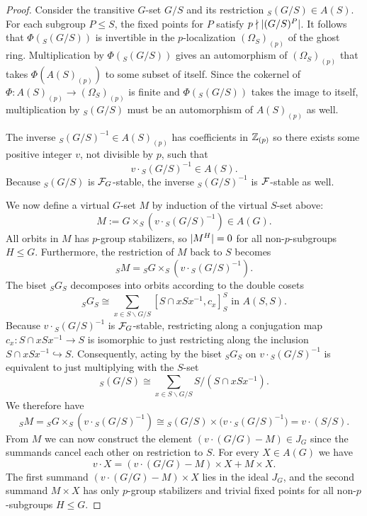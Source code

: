 \documentclass[10pt]{amsart}
\theoremstyle{definition}
\DeclarePairedDelimiter{\abs}{\lvert}{\rvert}
\begin{document}
\begin{proof}
Consider the transitive $G$-set $G/S$ and its restriction ${}_S(G/S)\in A(S)$. For each subgroup $P\leq S$, the fixed points for $P$ satisfy $p\nmid \abs{(G/S)^P}$. It follows that $\Phi({}_S(G/S))$ is invertible in the $p$-localization $(\Omega_S)_{(p)}$ of the ghost ring.
Multiplication by $\Phi({}_S (G/S))$ gives an automorphism of $(\Omega_S)_{(p)}$ that takes $\Phi(A(S)_{(p)})$ to some subset of itself. Since the cokernel of $\Phi\colon A(S)_{(p)}\to (\Omega_S)_{(p)}$ is finite and $\Phi({}_S(G/S))$ takes the image to itself, multiplication by ${}_S(G/S)$ must be an automorphism of $A(S)_{(p)}$ as well.

The inverse ${}_S(G/S)^{-1} \in A(S)_{(p)}$ has coefficients in $\mathbb{Z}_{(p)}$ so there exists some positive integer $v$, not divisible by $p$, such that
\[v\cdot {}_S(G/S)^{-1} \in A(S).\]
Because ${}_S(G/S)$ is $\mathcal{F}_G$-stable, the inverse ${}_S(G/S)^{-1}$ is $\mathcal{F}$-stable as well.

We now define a virtual $G$-set $M$ by induction of the virtual $S$-set above:
\[M := G\times_S (v\cdot {}_S(G/S)^{-1})\in A(G).\]
All orbits in $M$ has $p$-group stabilizers, so $\abs{M^H}=0$ for all non-$p$-subgroups $H\leq G$. Furthermore, the restriction of $M$ back to $S$ becomes
\[{}_S M = {}_SG \times_S (v\cdot {}_S(G/S)^{-1}).\]
The biset ${}_S G_S$ decomposes into orbits according to the double cosets
\[{}_S G_S \cong \sum_{x\in S\backslash G/S} [S\cap xSx^{-1}, c_x]_S^S \text{ in $A(S,S)$}.\]
Because $v\cdot {}_S(G/S)^{-1}$ is $\mathcal{F}_G$-stable, restricting along a conjugation map $c_x\colon S\cap xSx^{-1}\to S$ is isomorphic to just restricting along the inclusion $S\cap xSx^{-1}\hookrightarrow S$. Consequently, acting by the biset ${}_S G_S$ on $v\cdot {}_S(G/S)^{-1}$ is equivalent to just multiplying with the $S$-set
\[{}_S (G/S) \cong \sum_{x\in S\backslash G/S} S/(S\cap xSx^{-1}).\]
We therefore have
\[{}_S M =  {}_SG \times_S (v\cdot {}_S(G/S)^{-1}) \cong {}_S(G/S) \times \bigl(v\cdot {}_S(G/S)^{-1}\bigr) = v\cdot (S/S).\]
From $M$ we can now construct the element $(v\cdot (G/G) - M)\in J_G$ since the summands cancel each other on restriction to $S$.
For every $X\in A(G)$ we have
\[v\cdot X = (v\cdot (G/G) - M)\times X + M\times X.\]
The first summand $(v\cdot (G/G) - M)\times X$ lies in the ideal $J_G$, and the second summand $M\times X$ has only $p$-group stabilizers and trivial fixed points for all non-$p$-subgroups $H\leq G$.


\end{proof}
\end{document}
